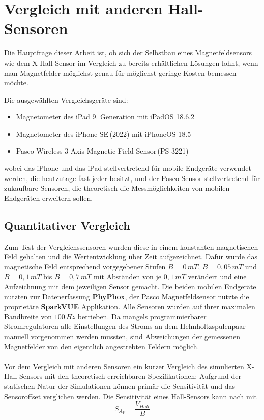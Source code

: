 \documentclass[12pt, a4paper]{article}
\begin{document}
\section{Vergleich mit anderen Hall-Sensoren}


Die Hauptfrage dieser Arbeit ist, ob sich der Selbstbau eines Magnetfeldsensors wie dem X-Hall-Sensor im Vergleich zu bereits erhältlichen Lösungen lohnt, wenn man Magnetfelder möglichst genau für möglichst geringe Kosten bemessen möchte. 
\pagebreak

{\raggedright 
	Die ausgewählten Vergleichsgeräte sind:}
\begin{itemize}
	\item Magnetometer des iPad 9. Generation mit iPadOS 18.6.2
	\item Magnetometer des iPhone SE\,(2022) mit iPhoneOS 18.5
	\item Pasco Wireless 3-Axis Magnetic Field Sensor\,(PS-3221) 
\end{itemize} 
wobei das iPhone und das iPad stellvertretend für mobile Endgeräte verwendet werden, die heutzutage fast jeder besitzt, und der Pasco Sensor stellvertretend für zukaufbare Sensoren, die theoretisch die Messmöglichkeiten von mobilen Endgeräten erweitern sollen.

\subsection{Quantitativer Vergleich}
Zum Test der Vergleichssensoren wurden diese in einem konstanten magnetischen Feld gehalten und die Wertentwicklung über Zeit aufgezeichnet. Dafür wurde das magnetische Feld entsprechend vorgegebener Stufen $B=0\,mT$, $B=0,05\,mT$ und $B=0,1\,mT$ bis $B=0,7\,mT$ mit Abständen von je $0,1\,mT$ verändert und eine Aufzeichnung mit dem jeweiligen Sensor gemacht. Die beiden mobilen Endgeräte nutzten zur Datenerfassung \textbf{PhyPhox}, der Pasco Magnetfeldsensor nutzte die proprietäre \textbf{SparkVUE} Applikation. Alle Sensoren wurden auf ihrer maximalen Bandbreite von $100\,Hz$ betrieben.\newline
Da mangels programmierbarer Stromregulatoren alle Einstellungen des Stroms an dem Helmholtzspulenpaar manuell vorgenommen werden mussten, sind Abweichungen der gemessenen Magnetfelder von den eigentlich angestrebten Feldern möglich.\paragraph{}

Vor dem Vergleich mit anderen Sensoren ein kurzer Vergleich des simulierten X-Hall-Sensors mit den theoretisch erreichbaren Spezifikationen:\newline
Aufgrund der statischen Natur der Simulationen können primär die Sensitivität und das Sensoroffset verglichen werden. Die Sensitivität eines Hall-Sensors kann nach \cite{heidari15} mit 
\begin{equation}
	{S_{A_V}}=\frac{V_{Hall}}{B}
	\tag{5.1}
	\label{5.1}
\end{equation}
\end{document}
